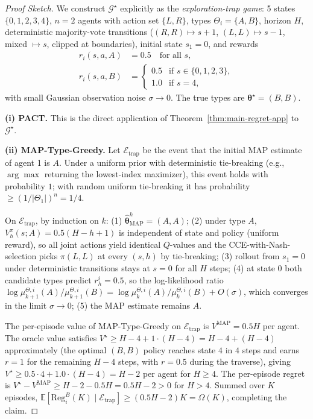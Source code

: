 \begin{proof}[Proof Sketch]
We construct $\mathcal{G}^\star$ explicitly as the \emph{exploration-trap game}: 5 states $\{0, 1, 2, 3, 4\}$, $n = 2$ agents with action set $\{L, R\}$, types $\Theta_i = \{A, B\}$, horizon $H$, deterministic majority-vote transitions ($(R, R) \mapsto s+1$, $(L, L) \mapsto s-1$, mixed $\mapsto s$, clipped at boundaries), initial state $s_1 = 0$, and rewards
\begin{align}
r_i(s, a, A) &= 0.5 \quad \text{for all } s, \\
r_i(s, a, B) &= \begin{cases} 0.5 & \text{if } s \in \{0, 1, 2, 3\}, \\ 1.0 & \text{if } s = 4, \end{cases}
\end{align}
with small Gaussian observation noise $\sigma \to 0$. The true types are $\boldsymbol{\theta}^\star = (B, B)$.

\textbf{(i) PACT.} This is the direct application of Theorem~\ref{thm:main-regret-app} to $\mathcal{G}^\star$.

\textbf{(ii) MAP-Type-Greedy.} Let $\mathcal{E}_{\mathrm{trap}}$ be the event that the initial MAP estimate of agent 1 is $A$. Under a uniform prior with deterministic tie-breaking (e.g., $\arg\max$ returning the lowest-index maximizer), this event holds with probability $1$; with random uniform tie-breaking it has probability $\geq (1/|\Theta_1|)^n = 1/4$.

On $\mathcal{E}_{\mathrm{trap}}$, by induction on $k$: (1) $\hat{\boldsymbol{\theta}}_{\mathrm{MAP}}^k = (A, A)$; (2) under type $A$, $V_h^{\pi}(s; A) = 0.5(H-h+1)$ is independent of state and policy (uniform reward), so all joint actions yield identical $Q$-values and the CCE-with-Nash-selection picks $\pi(L, L)$ at every $(s, h)$ by tie-breaking; (3) rollout from $s_1 = 0$ under deterministic transitions stays at $s = 0$ for all $H$ steps; (4) at state $0$ both candidate types predict $r_h^i = 0.5$, so the log-likelihood ratio $\log \mu_{k+1}^{\Theta,i}(A) / \mu_{k+1}^{\Theta,i}(B) = \log \mu_k^{\Theta,i}(A) / \mu_k^{\Theta,i}(B) + O(\sigma)$, which converges in the limit $\sigma \to 0$; (5) the MAP estimate remains $A$.

The per-episode value of MAP-Type-Greedy on $\mathcal{E}_{\mathrm{trap}}$ is $V^{\mathrm{MAP}} = 0.5 H$ per agent. The oracle value satisfies $V^\star \geq H - 4 + 1 \cdot (H - 4) = H - 4 + (H - 4)$ approximately (the optimal $(B, B)$ policy reaches state $4$ in $4$ steps and earns $r = 1$ for the remaining $H - 4$ steps, with $r = 0.5$ during the traverse), giving $V^\star \geq 0.5 \cdot 4 + 1.0 \cdot (H - 4) = H - 2$ per agent for $H \geq 4$. The per-episode regret is $V^\star - V^{\mathrm{MAP}} \geq H - 2 - 0.5 H = 0.5 H - 2 > 0$ for $H > 4$. Summed over $K$ episodes, $\mathbb{E}[\mathrm{Reg}_i^B(K) \mid \mathcal{E}_{\mathrm{trap}}] \geq (0.5 H - 2) K = \Omega(K)$, completing the claim.


\end{proof}
